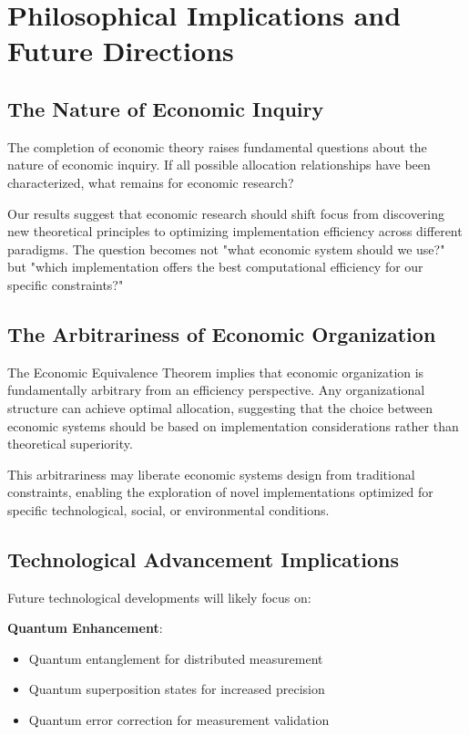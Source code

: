 \documentclass[12pt,a4paper]{article}
\begin{document}
\section{Philosophical Implications and Future Directions}

\subsection{The Nature of Economic Inquiry}

The completion of economic theory raises fundamental questions about the nature of economic inquiry. If all possible allocation relationships have been characterized, what remains for economic research?

Our results suggest that economic research should shift focus from discovering new theoretical principles to optimizing implementation efficiency across different paradigms. The question becomes not "what economic system should we use?" but "which implementation offers the best computational efficiency for our specific constraints?"

\subsection{The Arbitrariness of Economic Organization}

The Economic Equivalence Theorem implies that economic organization is fundamentally arbitrary from an efficiency perspective. Any organizational structure can achieve optimal allocation, suggesting that the choice between economic systems should be based on implementation considerations rather than theoretical superiority.

This arbitrariness may liberate economic systems design from traditional constraints, enabling the exploration of novel implementations optimized for specific technological, social, or environmental conditions.

\subsection{Technological Advancement Implications}

Future technological developments will likely focus on:

\textbf{Quantum Enhancement}:
\begin{itemize}
\item Quantum entanglement for distributed measurement
\item Quantum superposition states for increased precision
\item Quantum error correction for measurement validation
\end{itemize}
\end{document}
